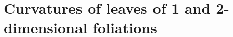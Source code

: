 \documentclass{amsart}
\theoremstyle{definition}
\numberwithin{equation}{section}
\numberwithin{figure}{section}
\begin{document}
%
%

\appendix
\section{Curvatures of leaves of 1 and 2-dimensional foliations}\label{Ap_curvature}
\end{document}
